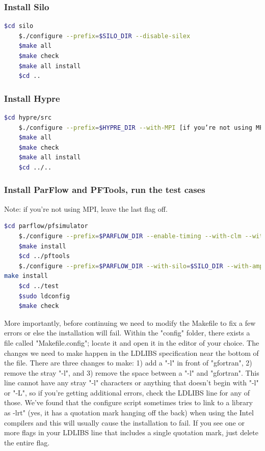 \documentclass[11pt,a4paper]{report}
\begin{document}
\subsubsection{Install Silo} 
\begin{lstlisting}[language=bash]
    $cd silo
    $./configure --prefix=$SILO_DIR --disable-silex
    $make all
    $make check
    $make all install
    $cd ..
 \end{lstlisting}
 
 
\subsubsection{Install Hypre}
\begin{lstlisting}[language=bash]
    $cd hypre/src
    $./configure --prefix=$HYPRE_DIR --with-MPI [if you’re not using MPI, use --without-MPI]
    $make all
    $make check
    $make all install
    $cd ../..
 \end{lstlisting}

\subsubsection{Install ParFlow and PFTools, run the test cases}
Note: if you’re not using MPI, leave the last flag off.
\begin{lstlisting}[language=bash]
    $cd parflow/pfsimulator
    $./configure --prefix=$PARFLOW_DIR --enable-timing --with-clm --with-silo=$SILO_DIR --with-hypre=$HYPRE_DIR --with-amps=mpi1
    $make install
    $cd ../pftools
    $./configure --prefix=$PARFLOW_DIR --with-silo=$SILO_DIR --with-amps=mpi1
make install
    $cd ../test
    $sudo ldconfig
    $make check
 \end{lstlisting}

More importantly, before continuing we need to modify the Makefile to fix a few errors or else the installation will fail. Within the "config" folder, there exists a file called "Makefile.config"; locate it and open it in the editor of your choice. The changes we need to make happen in the LDLIBS specification near the bottom of the file. There are three changes to make: 
1) add a "-l" in front of "gfortran", 
2) remove the stray "-l", and 
3) remove the space between a "-l" and "gfortran".
This line cannot have any stray "-l" characters or anything that doesn't begin with "-l" or "-L", so if you're getting additional errors, check the LDLIBS line for any of those.
We've found that the configure script sometimes tries to link to a library as -lrt" (yes, it has a quotation mark hanging off the back) when using the Intel compilers and this will usually cause the installation to fail. If you see one or more flags in your LDLIBS line that includes a single quotation mark, just delete the entire flag.
\end{document}
